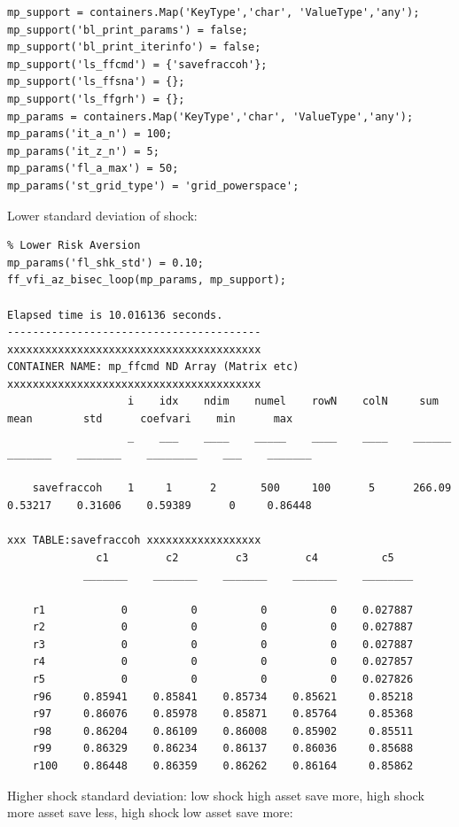 \documentclass[
]{book}
\begin{document}
\begin{verbatim}
mp_support = containers.Map('KeyType','char', 'ValueType','any');
mp_support('bl_print_params') = false;
mp_support('bl_print_iterinfo') = false;
mp_support('ls_ffcmd') = {'savefraccoh'};
mp_support('ls_ffsna') = {};
mp_support('ls_ffgrh') = {};
mp_params = containers.Map('KeyType','char', 'ValueType','any');
mp_params('it_a_n') = 100;
mp_params('it_z_n') = 5;
mp_params('fl_a_max') = 50;
mp_params('st_grid_type') = 'grid_powerspace';
\end{verbatim}

Lower standard deviation of shock:

\begin{verbatim}
% Lower Risk Aversion
mp_params('fl_shk_std') = 0.10;
ff_vfi_az_bisec_loop(mp_params, mp_support);

Elapsed time is 10.016136 seconds.
----------------------------------------
xxxxxxxxxxxxxxxxxxxxxxxxxxxxxxxxxxxxxxxx
CONTAINER NAME: mp_ffcmd ND Array (Matrix etc)
xxxxxxxxxxxxxxxxxxxxxxxxxxxxxxxxxxxxxxxx
                   i    idx    ndim    numel    rowN    colN     sum       mean        std      coefvari    min      max  
                   _    ___    ____    _____    ____    ____    ______    _______    _______    ________    ___    _______

    savefraccoh    1     1      2       500     100      5      266.09    0.53217    0.31606    0.59389      0     0.86448

xxx TABLE:savefraccoh xxxxxxxxxxxxxxxxxx
              c1         c2         c3         c4          c5   
            _______    _______    _______    _______    ________

    r1            0          0          0          0    0.027887
    r2            0          0          0          0    0.027887
    r3            0          0          0          0    0.027887
    r4            0          0          0          0    0.027857
    r5            0          0          0          0    0.027826
    r96     0.85941    0.85841    0.85734    0.85621     0.85218
    r97     0.86076    0.85978    0.85871    0.85764     0.85368
    r98     0.86204    0.86109    0.86008    0.85902     0.85511
    r99     0.86329    0.86234    0.86137    0.86036     0.85688
    r100    0.86448    0.86359    0.86262    0.86164     0.85862
\end{verbatim}

Higher shock standard deviation: low shock high asset save more, high
shock more asset save less, high shock low asset save more:
\end{document}
